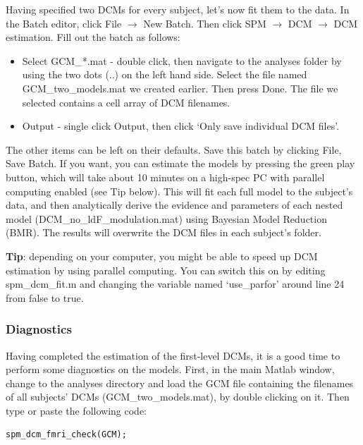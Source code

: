 \documentclass{article}
\begin{document}
Having specified two DCMs for every subject, let's now fit them to the data. In the Batch editor, click File $\rightarrow$ New Batch. Then click SPM $\rightarrow$ DCM $\rightarrow$ DCM estimation. Fill out the batch as follows:

\begin{itemize}
    \item Select GCM\_*.mat - double click, then navigate to the analyses folder by using the two dots (..) on the left hand side. Select the file named GCM\_two\_models.mat we created earlier. Then press Done. The file we selected contains a cell array of DCM filenames. 
    \item Output - single click Output, then click `Only save individual DCM files'.
\end{itemize}

The other items can be left on their defaults. Save this batch by clicking File, Save Batch. If you want, you can estimate the models by pressing the green play button, which will take about 10 minutes on a high-spec PC with parallel computing enabled (see Tip below). This will fit each full model to the subject's data, and then analytically derive the evidence and parameters of each nested model (DCM\_no\_ldF\_modulation.mat) using Bayesian Model Reduction (BMR). The results will overwrite the DCM files in each subject's folder. 

\textbf{Tip}: depending on your computer, you might be able to speed up DCM estimation by using parallel computing. You can switch this on by editing spm\_dcm\_fit.m and changing the variable named `use\_parfor' around line 24 from false to true.

\subsubsection{Diagnostics} \label{GUI_diagnostics}
Having completed the estimation of the first-level DCMs, it is a good time to perform some diagnostics on the models. First, in the main Matlab window, change to the analyses directory and load the GCM file containing the filenames of all subjects' DCMs (GCM\_two\_models.mat), by double clicking on it. Then type or paste the following code:

\begin{lstlisting}[style=Matlab-editor, caption=DCM for fMRI diagnostics]
spm_dcm_fmri_check(GCM);
\end{lstlisting}
\end{document}
